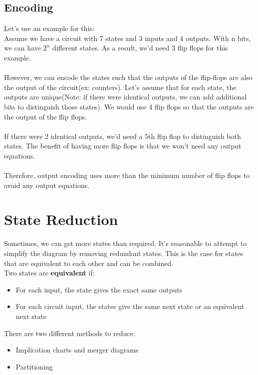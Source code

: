 \documentclass[12pt]{report}
\begin{document}
		\subsection{Encoding}
			Let's use an example for this:\\
			Assume we have a circuit with 7 states and 3 inputs and 4 outputs. With n bits, we can have $2^n$ different states. As a result, we'd need 3 flip flops for this example. \\
			\\
			However, we can encode the states such that the outputs of the flip-flops are also the output of the circuit(ex: counters). Let's assume that for each state, the outputs are unique(Note: if there were identical outputs, we can add additional bits to distinguish those states). We would use 4 flip flops so that the outputs are the output of the flip flops.\\
			\\
			If there were 2 identical outputs, we'd need a 5th flip flop to distinguish both states. The benefit of having more flip flops is that we won't need any output equations.
			\\
			\\
			Therefore, output encoding uses more than the minimum number of flip flops to avoid any output equations.
	\section{State Reduction}
		Sometimes, we can get more states than required. It's reasonable to attempt to simplify the diagram by removing redundant states. This is the case for states that are equivalent to each other and can be combined.\\
		Two states are \textbf{equivalent} if:\\
		\begin{itemize}
			\item For each input, the state gives the exact same outputs
			\item For each circuit input, the states give the same next state or an equivalent next state 
		\end{itemize}
		There are two different methods to reduce:\\
		\begin{itemize}
			\item Implication charts and merger diagrams
			\item Partitioning
		\end{itemize}
		
\end{document}
